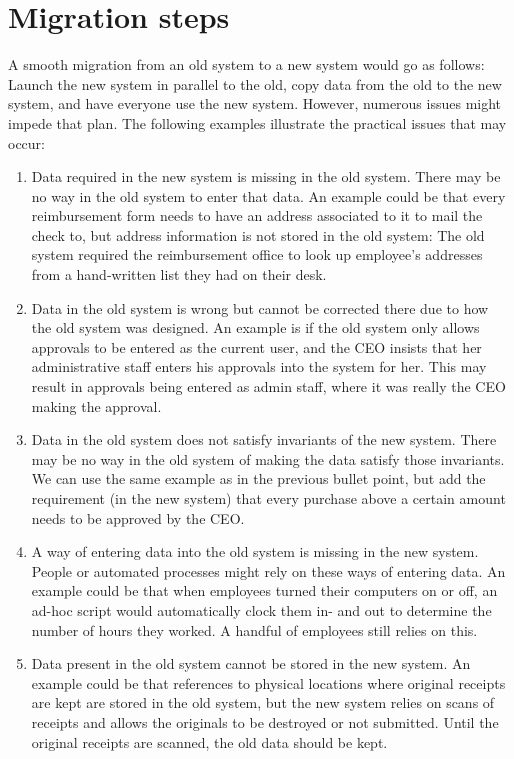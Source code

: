 \documentclass{elsarticle}
\begin{document}
\section{Migration steps}
	A smooth migration from an old system to a new system would go as follows:
	Launch the new system in parallel to the old, copy data from the old to the new system, and have everyone use the new system.
	However, numerous issues might impede that plan.
	The following examples illustrate the practical issues that may occur:
\begin{enumerate}
\item Data required in the new system is missing in the old system.
	There may be no way in the old system to enter that data.
	An example could be that every reimbursement form needs to have an address associated to it to mail the check to, but address information is not stored in the old system:
	The old system required the reimbursement office to look up employee's addresses from a hand-written list they had on their desk.
\item Data in the old system is wrong but cannot be corrected there due to how the old system was designed.
	An example is if the old system only allows approvals to be entered as the current user, and the CEO insists that her administrative staff enters his approvals into the system for her.
	This may result in approvals being entered as admin staff, where it was really the CEO making the approval.
\item Data in the old system does not satisfy invariants of the new system.
	There may be no way in the old system of making the data satisfy those invariants. We can use the same example as in the previous bullet point, but add the requirement (in the new system) that every purchase above a certain amount needs to be approved by the CEO.
\item A way of entering data into the old system is missing in the new system.
	People or automated processes might rely on these ways of entering data.
	An example could be that when employees turned their computers on or off, an ad-hoc script would automatically clock them in- and out to determine the number of hours they worked.
	A handful of employees still relies on this.
\item Data present in the old system cannot be stored in the new system.
	An example could be that references to physical locations where original receipts are kept are stored in the old system, but the new system relies on scans of receipts and allows the originals to be destroyed or not submitted.
	Until the original receipts are scanned, the old data should be kept.
\end{enumerate}
\end{document}
